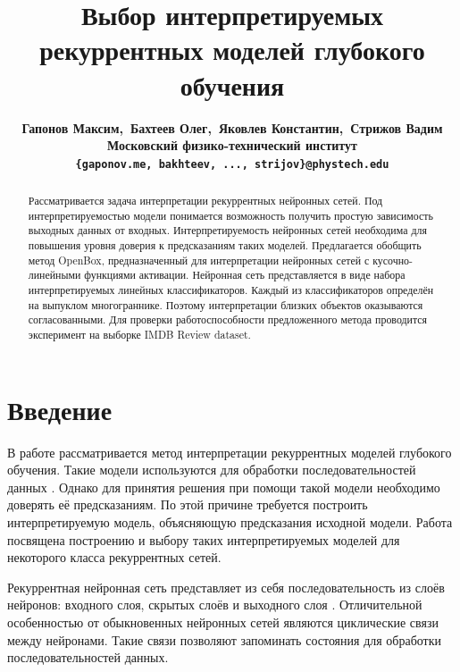 \documentclass[12pt]{article}
\begin{document}
\title{Выбор интерпретируемых рекуррентных моделей глубокого обучения}
\author{\normalsize\bf{Гапонов Максим,~Бахтеев Олег,~Яковлев Константин,~Стрижов Вадим} \\
	Московский физико-технический институт \\
	\texttt{\{gaponov.me,~bakhteev,~...,~strijov\}@phystech.edu}
}
\date{}
\maketitle
\begin{abstract}
Рассматривается задача интерпретации рекуррентных нейронных сетей. Под интерпретируемостью модели понимается возможность получить простую зависимость выходных данных от входных. Интерпретируемость нейронных сетей необходима для повышения уровня доверия к предсказаниям таких моделей. Предлагается обобщить метод OpenBox, предназначенный для интерпретации нейронных сетей с кусочно-линейными функциями активации. Нейронная сеть представляется в виде набора интерпретируемых линейных классификаторов. Каждый из классификаторов определён на выпуклом многограннике. Поэтому интерпретации близких объектов оказываются согласованными. Для проверки работоспособности предложенного метода проводится эксперимент на выборке IMDB Review dataset.
\end{abstract}


\section{Введение}
В работе рассматривается метод интерпретации рекуррентных моделей глубокого обучения. Такие модели используются для обработки последовательностей данных \cite{lipton2015critical}. Однако для принятия решения при помощи такой модели необходимо доверять её предсказаниям. По этой причине требуется построить интерпретируемую модель, объясняющую предсказания исходной модели. Работа посвящена построению и выбору таких интерпретируемых моделей для некоторого класса рекуррентных сетей.

Рекуррентная нейронная сеть представляет из себя последовательность из слоёв нейронов: входного слоя, скрытых слоёв и выходного слоя \cite{sherstinsky2020fundrnn}. Отличительной особенностью от обыкновенных нейронных сетей являются циклические связи между нейронами. Такие связи позволяют запоминать состояния для обработки последовательностей данных.
\end{document}
